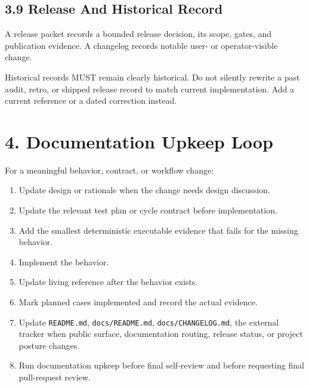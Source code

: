 \subsection{3.9 Release And Historical Record}\label{record-005-release-and-historical-record}

A release packet records a bounded release decision, its scope, gates, and publication evidence. A changelog records notable user- or operator-visible change.

Historical records MUST remain clearly historical. Do not silently rewrite a past audit, retro, or shipped release record to match current implementation. Add a current reference or a dated correction instead.

\section{4. Documentation Upkeep Loop}\label{record-005-documentation-upkeep-loop}

For a meaningful behavior, contract, or workflow change:

\begin{enumerate}
\def\labelenumi{\arabic{enumi}.}
\tightlist
\item
  Update design or rationale when the change needs design discussion.
\item
  Update the relevant test plan or cycle contract before implementation.
\item
  Add the smallest deterministic executable evidence that fails for the missing behavior.
\item
  Implement the behavior.
\item
  Update living reference after the behavior exists.
\item
  Mark planned cases implemented and record the actual evidence.
\item
  Update \texttt{R\allowbreak{}E\allowbreak{}A\allowbreak{}D\allowbreak{}M\allowbreak{}E\allowbreak{}.\allowbreak{}m\allowbreak{}d}, \texttt{d\allowbreak{}o\allowbreak{}c\allowbreak{}s\allowbreak{}/\allowbreak{}R\allowbreak{}E\allowbreak{}A\allowbreak{}D\allowbreak{}M\allowbreak{}E\allowbreak{}.\allowbreak{}m\allowbreak{}d}, \texttt{d\allowbreak{}o\allowbreak{}c\allowbreak{}s\allowbreak{}/\allowbreak{}C\allowbreak{}H\allowbreak{}A\allowbreak{}N\allowbreak{}G\allowbreak{}E\allowbreak{}L\allowbreak{}O\allowbreak{}G\allowbreak{}.\allowbreak{}m\allowbreak{}d}, the external tracker when public surface, documentation routing, release status, or project posture changes.
\item
  Run documentation upkeep before final self-review and before requesting final pull-request review.
\end{enumerate}

